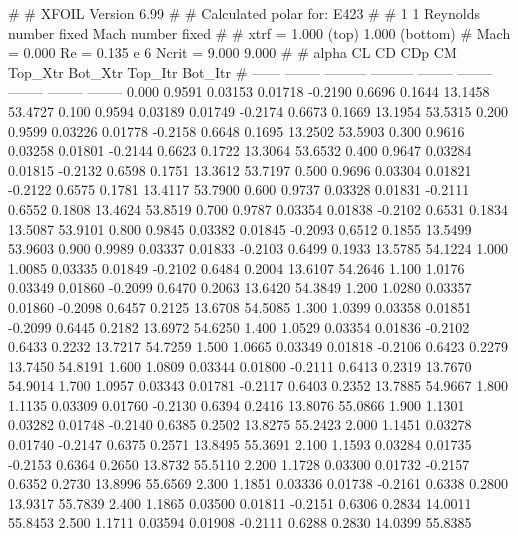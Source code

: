 #  
#       XFOIL         Version 6.99
#  
# Calculated polar for: E423                                            
#  
# 1 1 Reynolds number fixed          Mach number fixed         
#  
# xtrf =   1.000 (top)        1.000 (bottom)  
# Mach =   0.000     Re =     0.135 e 6     Ncrit =   9.000  9.000
#  
#   alpha    CL        CD       CDp       CM     Top_Xtr  Bot_Xtr  Top_Itr  Bot_Itr
#  ------ -------- --------- --------- -------- -------- -------- -------- --------
   0.000   0.9591   0.03153   0.01718  -0.2190   0.6696   0.1644  13.1458  53.4727
   0.100   0.9594   0.03189   0.01749  -0.2174   0.6673   0.1669  13.1954  53.5315
   0.200   0.9599   0.03226   0.01778  -0.2158   0.6648   0.1695  13.2502  53.5903
   0.300   0.9616   0.03258   0.01801  -0.2144   0.6623   0.1722  13.3064  53.6532
   0.400   0.9647   0.03284   0.01815  -0.2132   0.6598   0.1751  13.3612  53.7197
   0.500   0.9696   0.03304   0.01821  -0.2122   0.6575   0.1781  13.4117  53.7900
   0.600   0.9737   0.03328   0.01831  -0.2111   0.6552   0.1808  13.4624  53.8519
   0.700   0.9787   0.03354   0.01838  -0.2102   0.6531   0.1834  13.5087  53.9101
   0.800   0.9845   0.03382   0.01845  -0.2093   0.6512   0.1855  13.5499  53.9603
   0.900   0.9989   0.03337   0.01833  -0.2103   0.6499   0.1933  13.5785  54.1224
   1.000   1.0085   0.03335   0.01849  -0.2102   0.6484   0.2004  13.6107  54.2646
   1.100   1.0176   0.03349   0.01860  -0.2099   0.6470   0.2063  13.6420  54.3849
   1.200   1.0280   0.03357   0.01860  -0.2098   0.6457   0.2125  13.6708  54.5085
   1.300   1.0399   0.03358   0.01851  -0.2099   0.6445   0.2182  13.6972  54.6250
   1.400   1.0529   0.03354   0.01836  -0.2102   0.6433   0.2232  13.7217  54.7259
   1.500   1.0665   0.03349   0.01818  -0.2106   0.6423   0.2279  13.7450  54.8191
   1.600   1.0809   0.03344   0.01800  -0.2111   0.6413   0.2319  13.7670  54.9014
   1.700   1.0957   0.03343   0.01781  -0.2117   0.6403   0.2352  13.7885  54.9667
   1.800   1.1135   0.03309   0.01760  -0.2130   0.6394   0.2416  13.8076  55.0866
   1.900   1.1301   0.03282   0.01748  -0.2140   0.6385   0.2502  13.8275  55.2423
   2.000   1.1451   0.03278   0.01740  -0.2147   0.6375   0.2571  13.8495  55.3691
   2.100   1.1593   0.03284   0.01735  -0.2153   0.6364   0.2650  13.8732  55.5110
   2.200   1.1728   0.03300   0.01732  -0.2157   0.6352   0.2730  13.8996  55.6569
   2.300   1.1851   0.03336   0.01738  -0.2161   0.6338   0.2800  13.9317  55.7839
   2.400   1.1865   0.03500   0.01811  -0.2151   0.6306   0.2834  14.0011  55.8453
   2.500   1.1711   0.03594   0.01908  -0.2111   0.6288   0.2830  14.0399  55.8385
